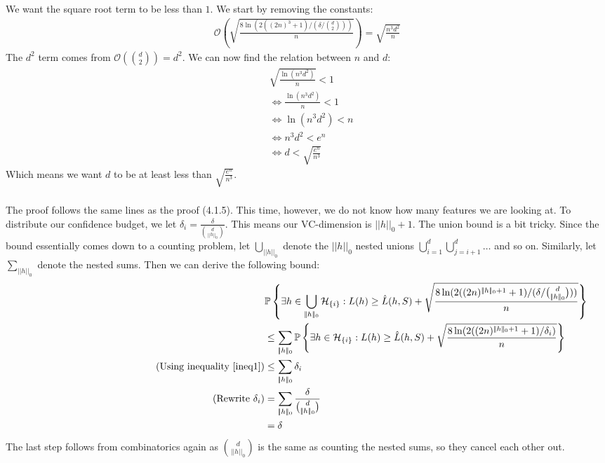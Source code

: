 \documentclass[a4paper]{article}
\newcommand{\comment}[1]{%
  \text{\phantom{(#1)}} \tag{#1}}
\def\dpip{|\!|}
\begin{document}
\subsubsection{}
We want the square root term to be less than $1$. We start by removing the constants:
\begin{align*}
  \mathcal{O}\left(\sqrt{\frac{8\ln(2((2n)^{3}+1)/(\delta/\binom{d}{2}))}{n}}\right) = \sqrt{\frac{n^3d^2}{n}}
\end{align*}
The $d^2$ term comes from $\mathcal{O}\left(\binom{d}{2}\right)=d^2$. We can now find the relation between $n$ and $d$:
\begin{align*}
  &\sqrt{\frac{\ln (n^3d^2)}{n}} < 1 \\
  &\Leftrightarrow \frac{\ln(n^3d^2)}{n} < 1 \\
  &\Leftrightarrow \ln\left(n^3d^2\right) < n \\
  &\Leftrightarrow n^3d^2 < e^n \\
  &\Leftrightarrow d < \sqrt{\frac{e^n}{n^3}}
\end{align*}
Which means we want $d$ to be at least less than $\sqrt{\frac{e^n}{n^3}}$.

\subsubsection{}
The proof follows the same lines as the proof (4.1.5). This time, however, we do not know how many features we are looking at. To distribute our confidence budget, we let $\delta_i=\frac{\delta}{\binom{d}{\dpip h\dpip_0}}$. This means our VC-dimension is $\dpip h\dpip_0+1$. The union bound is a bit tricky. Since the bound essentially comes down to a counting problem, let $\bigcup_{\dpip h\dpip_0}$ denote the $\dpip h\dpip_0$ nested unions $\bigcup_{i=1}^d \bigcup_{j=i+1}^d \dots$ and so on. Similarly, let $\sum_{\dpip h\dpip_0}$ denote the nested sums. Then we can derive the following bound:
\begin{align*}
  &\mathbb{P}\left\{ \exists h \in \bigcup_{\dpip h\dpip_0} \mathcal{H}_{\{i\}} : L(h)\geq \hat{L}(h, S)+\sqrt{\frac{8\ln(2((2n)^{\dpip h\dpip_0+1}+1)/(\delta/\binom{d}{\dpip h\dpip_0}))}{n}}\right\} \\
  &\leq \sum_{\dpip h\dpip_0}\mathbb{P}\left\{ \exists h \in \mathcal{H}_{\{i\}} : L(h)\geq \hat{L}(h, S)+\sqrt{\frac{8\ln(2((2n)^{\dpip h\dpip_0+1}+1)/\delta_i)}{n}}\right\} \\
  \comment{Using inequality \ref{ineq1}} &\leq \sum_{\dpip h\dpip_0} \delta_i \\
  \comment{Rewrite $\delta_i$} &=\sum_{\dpip h\dpip_0}\frac{\delta}{\binom{d}{\dpip h\dpip_0}} \\
                               &= \delta
\end{align*}
The last step follows from combinatorics again as $\binom{d}{\dpip h\dpip_0}$ is the same as counting the nested sums, so they cancel each other out.
\end{document}
